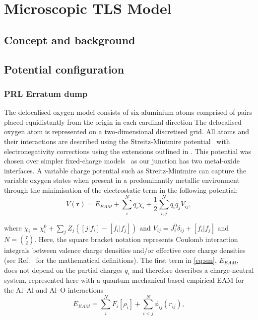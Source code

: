 \chapter{Microscopic TLS Model}\label{ch:tls}

\section{Concept and background}

\section{Potential configuration}

\subsection{PRL Erratum dump}
The delocalised oxygen model consists of six aluminium atoms comprised of pairs placed equidistantly from the origin in each cardinal direction
The delocalised oxygen atom is represented on a two-dimensional discretised grid. All atoms and their interactions are described using the Streitz-Mintmire potential~\cite{Streitz1994} with electronegativity corrections using the extensions outlined in .
This potential was chosen over simpler fixed-charge models~\cite{Catlow1982,Dienes1975} as our junction has two metal-oxide interfaces.
A variable charge potential such as Streitz-Mintmire can capture the variable oxygen states when present in a predominantly metallic environment through the minimisation of the electrostatic term in the following potential:
\begin{equation}
\label{eq:sm}
V(\mathbf{r}) = E_{EAM}+\sum_{i}^{N}q_i\chi_i + \frac{1}{2}\sum_{i,j}^{N}q_{i}q_{j}V_{ij},
\end{equation}

where $\chi_i = \chi_i^0 + \sum_{j}Z_{j}(\left[j|f_i\right]-\left[f_i|f_j\right])$ and $V_{ij} = J_{i}^{0}\delta_{ij}+\left[f_i|f_j\right]$ and $N = \binom{7}{2}$.
Here, the square bracket notation represents Coulomb interaction integrals between valence charge densities and/or effective core charge densities (see Ref.\  for the mathematical definitions).
The first term in \cref{eq:sm}, $E_{EAM}$, does not depend on the partial charges $q_i$ and therefore describes a charge-neutral system, represented here with a quantum mechanical based empirical EAM for the Al--Al and Al--O interactions
\begin{equation}
E_{EAM} = \sum_{i}^{N}F_{i}\left[\rho_i\right]+\sum_{i<j}^{N}\phi_{ij}(r_{ij}),
\end{equation}

